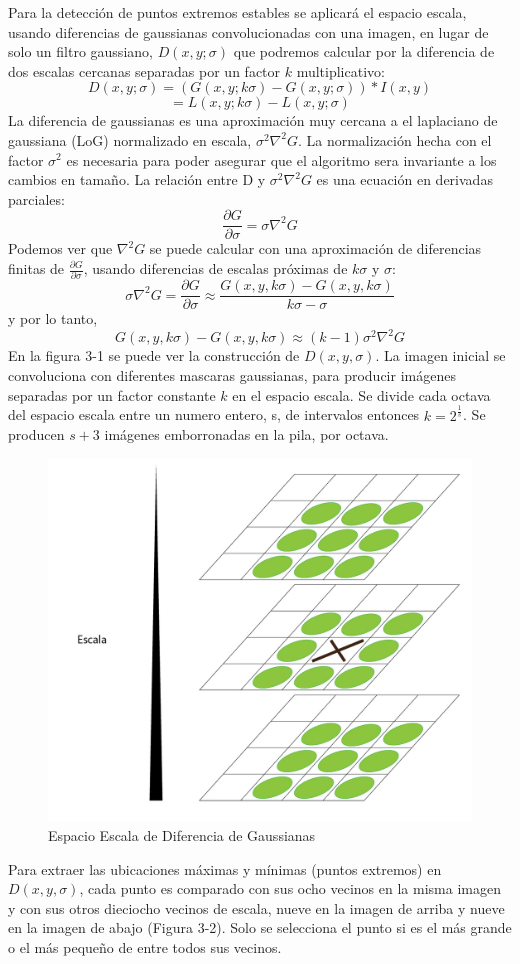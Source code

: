 		Para la detección de puntos extremos estables se aplicará el espacio escala, usando diferencias de gaussianas convolucionadas con una imagen, en lugar de solo un filtro gaussiano, $D(x,y;\sigma)$  que podremos calcular por la diferencia de dos escalas cercanas separadas por un factor $k$ multiplicativo:
		$$D(x,y;\sigma) = (G(x,y;k\sigma) - G(x,y;\sigma)) * I(x,y)$$ $$= L(x,y;k\sigma) - L(x,y;\sigma)$$
		La diferencia de gaussianas es una aproximación muy cercana a el laplaciano de gaussiana (LoG) normalizado en escala, $\sigma^2 \nabla^2 G$. La normalización hecha con el factor $\sigma^2$ es necesaria para poder asegurar que el algoritmo sera invariante a los cambios en tamaño. La relación entre D y $\sigma^2 \nabla^2 G$ es una ecuación en derivadas parciales:
		$$\frac{\partial G}{\partial \sigma} = \sigma \nabla^2 G$$
		Podemos ver que $\nabla^2 G$ se puede calcular con una aproximación de diferencias finitas de  $\frac{\partial G}{\partial \sigma}$, usando diferencias de escalas próximas de $k\sigma$ y $\sigma$:
		$$ \sigma \nabla^2 G = \frac{ \partial G}{\partial \sigma} \approx  \frac{G(x , y , k \sigma) - G( x , y, k \sigma)}{k \sigma - \sigma}$$
		y por lo tanto,
		$$ G(x , y , k \sigma) - G( x , y, k \sigma) \approx (k - 1)\sigma^2 \nabla^2 G $$
		En la figura 3-1 se puede ver la construcción de $D(x,y,\sigma)$. La imagen inicial se convoluciona con diferentes mascaras gaussianas, para producir imágenes separadas por un factor constante $k$ en el espacio escala. Se divide cada octava del espacio escala entre un numero entero, s, de intervalos entonces $k= 2^\frac{1}{s}$. Se producen $s+3$  imágenes emborronadas en la pila, por octava.
		\begin{figure}[h]
			\centering
				\includegraphics[scale=0.3]{img/EscalaPuntosExtremos.jpg}
			\caption{Espacio Escala de Diferencia de Gaussianas}
		\end{figure}
		Para extraer las ubicaciones máximas y mínimas (puntos extremos) en $D(x,y,\sigma)$, cada punto es comparado con sus ocho vecinos en la misma imagen y con sus otros dieciocho vecinos de escala, nueve en la imagen de arriba y nueve en la imagen de abajo (Figura 3-2). Solo se selecciona el punto si es el más grande o el más pequeño de entre todos sus vecinos.
	
